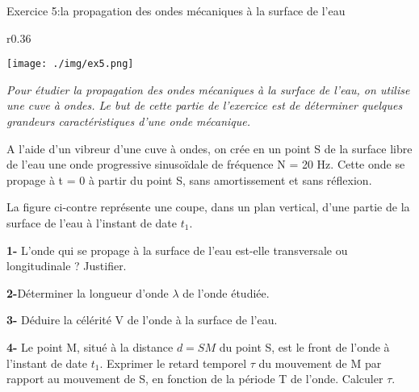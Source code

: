 \documentclass[12pt, french]{article}
\begin{document}
\begin{Box2}{Exercice 5:la propagation des ondes mécaniques à la surface de l'eau }

	\begin{wrapfigure}[7]{r}{0.36\textwidth}
  \begin{center}
	\texttt{[image: ./img/ex5.png]}
  \end{center}
\end{wrapfigure}


\emph{Pour étudier la propagation des ondes mécaniques à la surface de l'eau, on utilise une cuve à ondes.
Le but de cette partie de l’exercice est de déterminer quelques
grandeurs caractéristiques d'une onde mécanique.}

A l'aide d'un vibreur d'une cuve à ondes, on crée en un point S
de la surface libre de l'eau une onde progressive sinusoïdale de
fréquence N = 20 Hz. Cette onde se propage à t = 0 à partir
du point S, sans amortissement et sans réflexion.

La figure ci-contre représente une coupe, dans un plan vertical, d'une partie de la surface de l'eau à
l'instant de date $t_1$.

\textbf{1- }L'onde qui se propage à la surface de l'eau est-elle transversale ou longitudinale ? Justifier.

\textbf{2-}Déterminer la longueur d'onde $\lambda$ de l'onde étudiée.

\textbf{3- } Déduire la célérité V de l'onde à la surface de l'eau.

\textbf{4- } Le point M, situé à la distance $d=SM$ du point S, est le front de l'onde à l'instant de date $t_1$. Exprimer le retard temporel $\tau$ du mouvement de M par rapport au mouvement de S, en fonction de la période T de l'onde. Calculer $\tau$.



\end{Box2}
\end{document}
